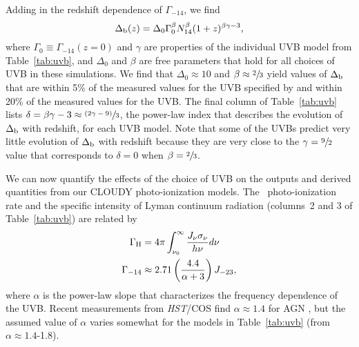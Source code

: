 \documentclass[twocolumn,twocolappendix,tighten,times]{aastex6}
\newcommand{\HI}{\ion{H}{1}}
\newcommand{\hst}{{\sl HST}}
\begin{document}
Adding in the redshift dependence of $\Gamma_{-14}$, we find
\begin{equation}
\Delta_{\rm b}(z) = \Delta_0 \Gamma_0^{\beta} N_{14}^{\beta} (1+z)^{\beta\gamma-3},
\end{equation}
where $\Gamma_0 \equiv \Gamma_{-14}(z=0)$ and $\gamma$ are properties of the 
individual UVB model from Table~\ref{tab:uvb}, and $\Delta_0$ and $\beta$ are 
free parameters that hold for all choices of UVB in these simulations. We find 
that $\Delta_0\approx10$ and $\beta\approx\sfrac{2}{3}$ yield values of 
$\Delta_{\rm b}$ that are within 5\% of the measured values for the UVB specified 
by \citet{haardt01,haardt05} and within 20\% of the measured values for the 
\citet{haardt12} UVB.  The final column of Table~\ref{tab:uvb} lists 
$\delta=\beta\gamma-3\approx\sfrac{(2\gamma-9)}{3}$, the power-law index that 
describes the evolution of $\Delta_{\rm b}$ with redshift, for each UVB model. 
Note that some of the UVBs predict very little evolution of $\Delta_{\rm b}$ with 
redshift because they are very close to the $\gamma=\sfrac{9}{2}$ value that 
corresponds to $\delta=0$ when $\beta=\sfrac{2}{3}$.

We can now quantify the effects of the choice of UVB on the outputs and 
derived quantities from our CLOUDY photo-ionization models. The \HI\ 
photo-ionization rate and the specific intensity of Lyman continuum 
radiation (columns~2 and 3 of Table~\ref{tab:uvb}) are related by
\begin{align}
\label{eqn:gammaH}
\Gamma_{\rm H} &= 4\pi \int^{\infty}_{\nu_0} \frac{J_{\nu} \sigma_{\nu}}{h\nu} d\nu   \\*
\Gamma_{-14} &\approx 2.71 \left(\frac{4.4}{\alpha+3}\right) J_{-23}, \nonumber
\end{align}
where $\alpha$ is the power-law slope that characterizes the frequency dependence 
of the UVB. Recent measurements from \hst/COS find $\alpha\approx1.4$ for AGN 
\citep*{shull12,stevans14}, but the assumed value of $\alpha$ varies somewhat for 
the models in Table~\ref{tab:uvb} (from $\alpha\approx1.4$-1.8). 
\end{document}
